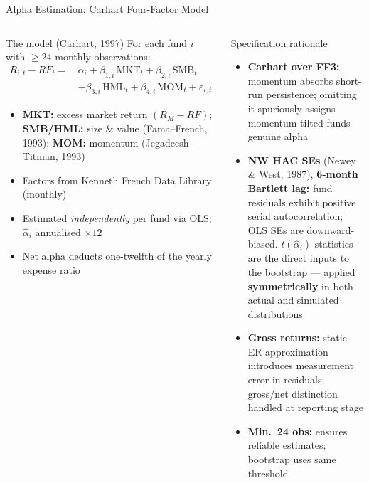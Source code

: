 \documentclass[aspectratio=169,10pt]{beamer}
\begin{document}
\begin{frame}{Alpha Estimation: Carhart Four-Factor Model}
\begin{columns}[T]
\begin{block}{The model (Carhart, 1997)}
{\footnotesize For each fund $i$ with $\geq 24$ monthly observations:}
\begin{align*}
R_{i,t} - RF_t = \,&\alpha_i + \beta_{1,i}\,\mathrm{MKT}_t + \beta_{2,i}\,\mathrm{SMB}_t \\
                   &+ \beta_{3,i}\,\mathrm{HML}_t + \beta_{4,i}\,\mathrm{MOM}_t + \varepsilon_{i,t}
\end{align*}
{\footnotesize
\begin{itemize}
  \item \textbf{MKT:} excess market return $(R_M - RF)$; \textbf{SMB/HML:} size \& value (Fama--French, 1993); \textbf{MOM:} momentum (Jegadeesh--Titman, 1993)
  \item Factors from Kenneth French Data Library (monthly)
  \item Estimated \emph{independently} per fund via OLS; $\hat{\alpha}_i$ annualised $\times 12$
  \item Net alpha deducts one-twelfth of the yearly expense ratio 
\end{itemize}}
\end{block}

\begin{block}{Specification rationale}
{\footnotesize
\begin{itemize}
  \item \textbf{Carhart over FF3:} momentum absorbs short-run persistence; omitting it spuriously assigns momentum-tilted funds genuine alpha
  \item \textbf{NW HAC SEs} (Newey \& West, 1987), \textbf{6-month Bartlett lag:} fund residuals exhibit positive serial autocorrelation; OLS SEs are downward-biased. $t(\hat{\alpha}_i)$ statistics are the direct inputs to the bootstrap — applied \textbf{symmetrically} in both actual and simulated distributions
  \item \textbf{Gross returns:} static ER approximation introduces measurement error in residuals; gross/net distinction handled at reporting stage
  \item \textbf{Min.\ 24 obs:} ensures reliable estimates; bootstrap uses same threshold
\end{itemize}}
\end{block}
\end{columns}
\end{frame}
\end{document}
